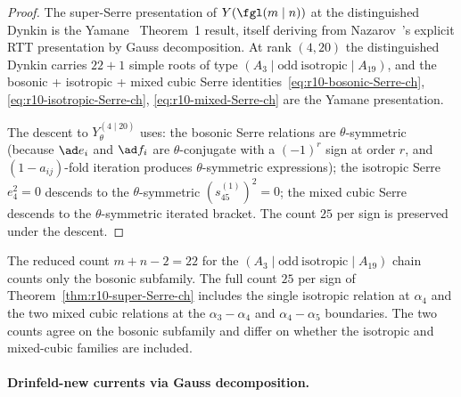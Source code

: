 \begin{proof}
The super-Serre presentation of $Y(\fgl(m \mid n))$ at the
distinguished Dynkin is the Yamane~\cite{Yamane1999}
Theorem~1 result, itself deriving from
Nazarov~\cite{Nazarov1991}'s explicit RTT presentation by Gauss
decomposition. At rank $(4, 20)$ the distinguished Dynkin carries
$22 + 1$ simple roots of type $(A_3 \mid \mathrm{odd\ isotropic}
\mid A_{19})$, and the bosonic + isotropic + mixed cubic Serre
identities~\eqref{eq:r10-bosonic-Serre-ch}, \eqref{eq:r10-isotropic-Serre-ch},
\eqref{eq:r10-mixed-Serre-ch} are the Yamane presentation.

The descent to $Y_\theta^{(4 \mid 20)}$ uses: the bosonic Serre
relations are $\theta$-symmetric (because $\ad e_i$ and $\ad f_i$
are $\theta$-conjugate with a $(-1)^{r}$ sign at order $r$, and
$(1 - a_{ij})$-fold iteration produces $\theta$-symmetric
expressions); the isotropic Serre $e_4^2 = 0$ descends to the
$\theta$-symmetric $(s^{(1)}_{45})^2 = 0$; the mixed cubic Serre
descends to the $\theta$-symmetric iterated bracket. The count $25$
per sign is preserved under the descent.
\end{proof}

\begin{remark}
\label{rem:r10-count-22-ch}
The reduced count $m+n-2=22$ for the
$(A_3 \mid \mathrm{odd\ isotropic} \mid A_{19})$ chain counts only
the bosonic subfamily. The full count $25$ per sign of
Theorem~\ref{thm:r10-super-Serre-ch} includes the single isotropic
relation at $\alpha_4$ and the two mixed cubic relations at the
$\alpha_3 - \alpha_4$ and $\alpha_4 - \alpha_5$ boundaries. The two
counts agree on the bosonic subfamily and differ on whether the
isotropic and mixed-cubic families are included.
\end{remark}

\paragraph{Drinfeld-new currents via Gauss decomposition.}


